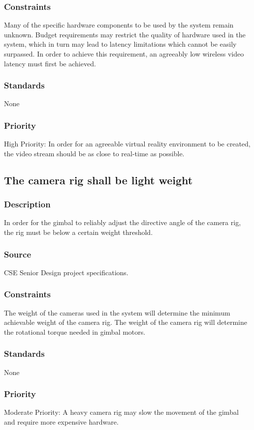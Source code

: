 \subsubsection{Constraints}
Many of the specific hardware components to be used by the system remain unknown. Budget requirements may restrict the quality of hardware used in the system, which in turn may lead to latency limitations which cannot be easily surpassed. In order to achieve this requirement, an agreeably low wireless video latency must first be achieved.
\subsubsection{Standards}
None
\subsubsection{Priority}
High Priority: In order for an agreeable virtual reality environment to be created, the video stream should be as close to real-time as possible.

\subsection{The camera rig shall be light weight}
\subsubsection{Description}
In order for the gimbal to reliably adjust the directive angle of the camera rig, the rig must be below a certain weight threshold. 
\subsubsection{Source}
CSE Senior Design project specifications.
\subsubsection{Constraints}
The weight of the cameras used in the system will determine the minimum achievable weight of the camera rig. The weight of the camera rig will determine the rotational torque needed in gimbal motors.
\subsubsection{Standards}
None
\subsubsection{Priority}
Moderate Priority: A heavy camera rig may slow the movement of the gimbal and require more expensive hardware. 

